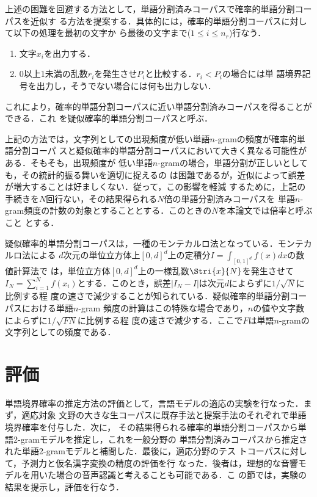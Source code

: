 \documentclass[japanese]{jnlp_1.4}
\begin{document}
上述の困難を回避する方法として，単語分割済みコーパスで確率的単語分割コーパスを近似す
る方法を提案する．具体的には，確率的単語分割コーパスに対して以下の処理を最初の文字か
ら最後の文字まで($1 \leq i \leq n_{r}$)行なう．
\begin{enumerate}

\item 文字$x_{i}$を出力する．

\item 0以上1未満の乱数$r_{i}$を発生させ$P_{i}$と比較する．$r_{i} < P_{i}$の場合には単
  語境界記号を出力し，そうでない場合には何も出力しない．

\end{enumerate}
これにより，確率的単語分割コーパスに近い単語分割済みコーパスを得ることができる．これ
を疑似確率的単語分割コーパスと呼ぶ．

上記の方法では，文字列としての出現頻度が低い単語$n$-gramの頻度が確率的単語分割コーパ
スと疑似確率的単語分割コーパスにおいて大きく異なる可能性がある．そもそも，出現頻度が
低い単語$n$-gramの場合，単語分割が正しいとしても，その統計的振る舞いを適切に捉えるの
は困難であるが，近似によって誤差が増大することは好ましくない．従って，この影響を軽減
するために，上記の手続きを$N$回行ない，その結果得られる$N$倍の単語分割済みコーパスを
単語$n$-gram頻度の計数の対象とすることとする．このときの$N$を本論文では倍率と呼ぶこと
とする．

疑似確率的単語分割コーパスは，一種のモンテカルロ法となっている．モンテカルロ法による
$d$次元の単位立方体上$[0,d]^{d}$上の定積分$I = \int_{[0,1]^{d}}f(x)dx$の数値計算法で
は，単位立方体$[0,d]^{d}$上の一様乱数$\Stri{x}{N}$を発生させて$I_{N} = \sum_{i=1}^{N}
f(x_{i})$とする．このとき，誤差$|I_{N}-I|$は次元$d$によらずに$1/\sqrt{N}$に比例する程
度の速さで減少することが知られている．疑似確率的単語分割コーパスにおける単語$n$-gram
頻度の計算はこの特殊な場合であり，$n$の値や文字数によらずに$1/\sqrt{FN}$に比例する程
度の速さで減少する．ここで$F$は単語$n$-gramの文字列としての頻度である．



\section{評価}

単語境界確率の推定方法の評価として，言語モデルの適応の実験を行なった．まず，適応対象
文野の大きな生コーパスに既存手法と提案手法のそれぞれで単語境界確率を付与した．次に，
その結果得られる確率的単語分割コーパスから単語2-gramモデルを推定し，これを一般分野の
単語分割済みコーパスから推定された単語2-gramモデルと補間した．最後に，適応分野のテス
トコーパスに対して，予測力と仮名漢字変換\cite{無限語彙の仮名漢字変換}の精度の評価を行
なった．後者は，理想的な音響モデルを用いた場合の音声認識と考えることも可能である．こ
の節では，実験の結果を提示し，評価を行なう．
\end{document}
